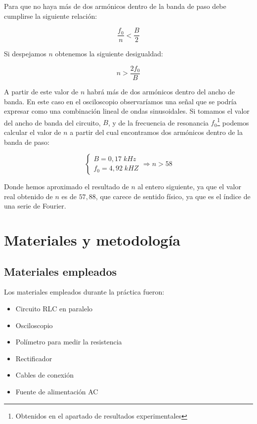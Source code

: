 \documentclass[a4paper,12pt,titlepage]{article}
\begin{document}
Para que no haya más de dos armónicos dentro de la banda de paso debe cumplirse la siguiente relación:

\begin{equation}
    \frac{f_0}{n} < \frac{B}{2}
\end{equation}

Si despejamos $n$ obtenemos la siguiente desigualdad:

\begin{equation}
    n > \frac{2f_0}{B}
\end{equation}

A partir de este valor de $n$ habrá más de dos armónicos dentro del ancho de banda. En este caso en el osciloscopio observaríamos una señal que se podría expresar como una combinación lineal de ondas sinusoidales. Si tomamos el valor del ancho de banda del circuito, $B$, y de la frecuencia de resonancia $f_0$\footnote{Obtenidos en el apartado de resultados experimentales} podemos calcular el valor de $n$ a partir del cual encontramos dos armónicos dentro de la banda de paso:

\begin{equation}
    \left\{\begin{array}{l}
        B = 0,17 \; kHz \\
        f_0 = 4,92 \; kHZ 
    \end{array} \right. \Rightarrow n > 58
\end{equation}

Donde hemos aproximado el resultado de $n$ al entero siguiente, ya que el valor real obtenido de $n$ es de $57,88$, que carece de sentido físico, ya que es el índice de una serie de Fourier.

\section{Materiales y metodología}

\subsection{Materiales empleados}

Los materiales empleados durante la práctica fueron:

\begin{itemize}
    \item Circuito RLC en paralelo
    \item Osciloscopio
    \item Polímetro para medir la resistencia
    \item Rectificador
    \item Cables de conexión
    \item Fuente de alimentación AC
\end{itemize}
\end{document}
